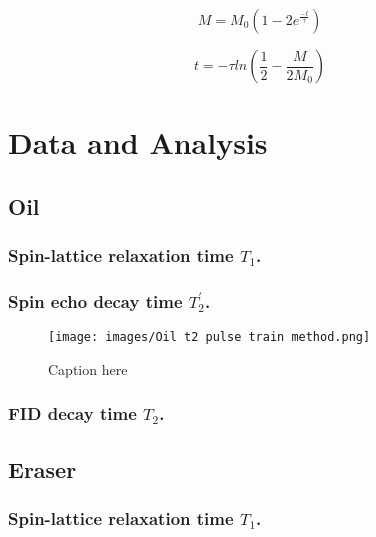 \documentclass[%
 reprint,
 amsmath,amssymb,
 aps,
]{revtex4-2}
\begin{document}
\begin{equation}
M=M_{0}(1-2e^\frac{-t}{\tau})
\end{equation}

\begin{equation}
t=-\tau ln(\frac{1}{2}-\frac{M}{2M_{0}})
\end{equation}

\section{Data and Analysis}


\subsection{Oil}
\subsubsection{Spin-lattice relaxation time $T_1$.}



\subsubsection{Spin echo decay time $T_2^{'}$.}
\begin{figure}[H]
\centering
\texttt{[image: images/Oil t2 pulse train method.png]}%
\caption{\label{fig:wide}Caption here}
\end{figure}




\subsubsection{FID decay time $T_2$.}






\subsection{Eraser}
\subsubsection{Spin-lattice relaxation time $T_1$.
}
\end{document}
